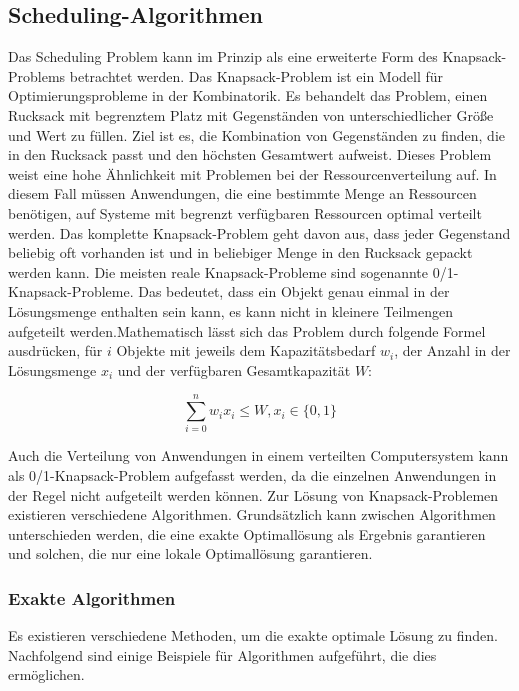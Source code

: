 \subsection{Scheduling-Algorithmen}
\label{Scheduling Algorithmen}

Das Scheduling Problem kann im Prinzip als eine erweiterte Form des Knapsack-Problems betrachtet werden. Das Knapsack-Problem ist ein Modell für Optimierungsprobleme in der Kombinatorik. Es behandelt das Problem, einen Rucksack mit begrenztem Platz mit Gegenständen von unterschiedlicher Größe und Wert zu füllen. Ziel ist es, die Kombination von Gegenständen zu finden, die in den Rucksack passt und den höchsten Gesamtwert aufweist. Dieses Problem weist eine hohe Ähnlichkeit mit Problemen bei der Ressourcenverteilung auf. In diesem Fall müssen Anwendungen, die eine bestimmte Menge an Ressourcen benötigen, auf Systeme mit begrenzt verfügbaren Ressourcen optimal verteilt werden. Das komplette Knapsack-Problem geht davon aus, dass jeder Gegenstand beliebig oft vorhanden ist und in beliebiger Menge in den Rucksack gepackt werden kann. Die meisten reale Knapsack-Probleme sind sogenannte 0/1-Knapsack-Probleme. Das bedeutet, dass ein Objekt genau einmal in der Lösungsmenge enthalten sein kann, es kann nicht in kleinere Teilmengen aufgeteilt werden.Mathematisch lässt sich das Problem durch folgende Formel ausdrücken, für $ i $ Objekte mit jeweils dem Kapazitätsbedarf $ w_i $, der Anzahl in der Lösungsmenge $ x_i $ und der verfügbaren Gesamtkapazität $ W $:

\begin{equation}
    \sum_{i=0}^n w_i x_i  \leq W, x_i \in \{0,1\} 
    \label{Eq:Knapsack}
\end{equation}

Auch die Verteilung von Anwendungen in einem verteilten Computersystem kann als 0/1-Knapsack-Problem aufgefasst werden, da die einzelnen Anwendungen in der Regel nicht aufgeteilt werden können. Zur Lösung von Knapsack-Problemen existieren verschiedene Algorithmen. Grundsätzlich kann zwischen Algorithmen unterschieden werden, die eine exakte Optimallösung als Ergebnis garantieren und solchen, die nur eine lokale Optimallösung garantieren. 

\subsubsection{Exakte Algorithmen}
\label{Exakte Algorithmen}

Es existieren verschiedene Methoden, um die exakte optimale Lösung zu finden. Nachfolgend sind einige Beispiele für Algorithmen aufgeführt, die dies ermöglichen. 

